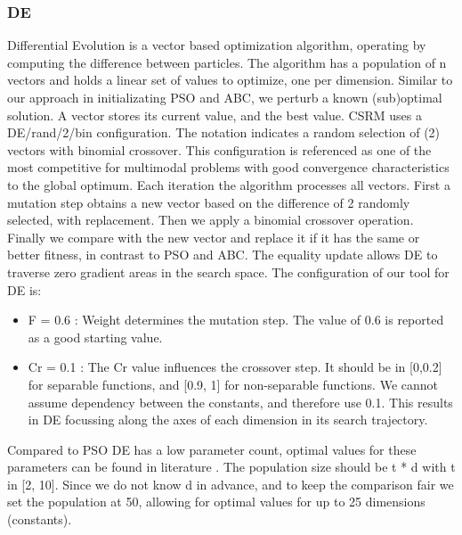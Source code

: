 \subsubsection{DE}
Differential Evolution is a vector based optimization algorithm, operating by computing the difference between particles. The algorithm has a population of n vectors and holds a linear set of values to optimize, one per dimension. Similar to our approach in initializating PSO and ABC, we perturb a known (sub)optimal solution. A vector stores its current value, and the best value. CSRM uses a DE/rand/2/bin configuration. The notation indicates a random selection of (2) vectors with binomial crossover. This configuration is referenced \cite{DE} as one of the most competitive for multimodal problems with good convergence characteristics to the global optimum. Each iteration the algorithm processes all vectors. First a mutation step obtains a new vector based on the difference of 2 randomly selected, with replacement. Then we apply a binomial crossover operation. Finally we compare with the new vector and replace it if it has the same or better fitness, in contrast to PSO and ABC. The equality update allows DE to traverse zero gradient areas in the search space.
The configuration of our tool for DE is:
\begin{itemize}
\item F = 0.6 : Weight determines the mutation step. The value of 0.6 is reported as a good starting value\citep{DESurveyLatest}. 
\item Cr = 0.1 : The Cr value influences the crossover step. It should be in [0,0.2] for separable functions, and [0.9, 1] for non-separable functions. We cannot assume dependency between the constants, and therefore use 0.1. This results in DE focussing along the axes of each dimension in its search trajectory. 
\end{itemize}
Compared to PSO DE has a low parameter count, optimal values for these parameters can be found in literature \cite{DESurveyLatest}. The population size should be t * d with t in [2, 10]. Since we do not know d in advance, and to keep the comparison fair we set the population at 50, allowing for optimal values for up to 25 dimensions (constants).